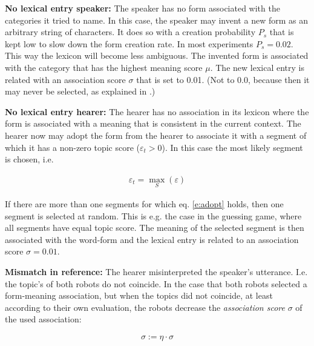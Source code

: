 \begin{description}
\item {\bf No lexical entry speaker:} The speaker has no form associated with the categories it tried to name. In this case, the speaker may invent a new form as an arbitrary string of characters. It does so with a creation probability $P_s$ that is kept low to slow down the form creation rate. In most experiments $P_s=0.02$. This way the lexicon will become less ambiguous. The invented form is associated with the category that has the highest meaning score $\mu$. The new lexical entry is related with an association score $\sigma$ that is set to 0.01. (Not to 0.0, because then it may never be selected, as explained in .)

\item {\bf No lexical entry hearer:} The hearer has no association in its lexicon where the form is associated with a meaning that is consistent in the current context. The hearer now may adopt the form from the hearer to associate it with a segment of which it has a non-zero topic score ($\varepsilon_t>0$). In this case the most likely segment is chosen, i.e. 

\begin{eqnarray}
\varepsilon_t = \max_S (\varepsilon)
\label{e:adopt}
\end{eqnarray}

\noindent
If there are more than one segments for which eq. \ref{e:adopt} holds, then one segment is selected at random. This is e.g. the case in the guessing game, where all segments have equal topic score. The meaning of the selected segment is then associated with the word-form and the lexical entry is related to an association score $\sigma=0.01$.

\item {\bf Mismatch in reference:} The hearer misinterpreted the speaker's utterance. I.e. the topic's of both robots do not coincide. In the case that both robots selected a form-meaning association, but when the topics did not coincide, at least according to their own evaluation, the robots decrease the {\em association score} $\sigma$ of the used association:

\begin{eqnarray}
\sigma := \eta \cdot \sigma
\label{e:cm:adapt1}
\end{eqnarray}



\end{description}
